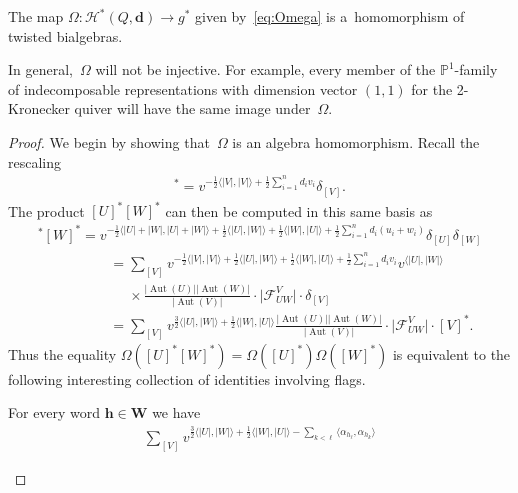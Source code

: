 \begin{Theorem}
\label{th:shuffle_character}
The map $\Omega: \mathcal{H}^*(Q,\mathbf{d})\to g^*$ given by~\eqref{eq:Omega} is a~homomorphism of twisted bialgebras.
\end{Theorem}

\begin{Remark}
In general,~$\Omega$ will not be injective.
For example, every member of the $\mathbb{P}^1$-family of indecomposable representations with dimension vector $(1,1)$
for the 2-Kronecker quiver will have the same image under~$\Omega$.
\end{Remark}

\begin{proof}
We begin by showing that~$\Omega$ is an algebra homomorphism.
Recall the rescaling
\begin{gather*}
[V]^*=v^{-\frac{1}{2}\langle |V|,|V|\rangle+\frac{1}{2}\sum\limits_{i=1}^n d_iv_i}\delta_{[V]}.
\end{gather*}
The product $[U]^*[W]^*$ can then be computed in this same basis as
\begin{gather*}
[U]^*[W]^*=v^{-\frac{1}{2}\langle |U|+|W|,|U|+|W|\rangle+\frac{1}{2}\langle |U|,|W|\rangle+\frac{1}{2}\langle
|W|,|U|\rangle+\frac{1}{2}\sum\limits_{i=1}^n d_i(u_i+w_i)}\delta_{[U]}\delta_{[W]}
\\
\phantom{[U]^*[W]^*}
 =\sum\limits_{[V]}v^{-\frac{1}{2}\langle |V|,|V|\rangle+\frac{1}{2}\langle |U|,|W|\rangle+\frac{1}{2}\langle
|W|,|U|\rangle+\frac{1}{2}\sum\limits_{i=1}^n d_iv_i}v^{\langle|U|,|W|\rangle}
\\
\phantom{[U]^*[W]^*=}{}
\times
\frac{|\operatorname{Aut}(U)||\operatorname{Aut}(W)|}{|\operatorname{Aut}(V)|}\cdot\big|\mathcal{F}^V_{UW}\big|\cdot \delta_{[V]}
\\
\phantom{[U]^*[W]^*}
 =\sum\limits_{[V]}v^{\frac{3}{2}\langle |U|,|W|\rangle+\frac{1}{2}\langle
|W|,|U|\rangle}\frac{|\operatorname{Aut}(U)||\operatorname{Aut}(W)|}{|\operatorname{Aut}(V)|}\cdot\big|\mathcal{F}^V_{UW}\big|\cdot [V]^*.
\end{gather*}
Thus the equality $\Omega([U]^*[W]^*)=\Omega([U]^*)\Omega([W]^*)$ is equivalent to the following interesting collection
of identities involving f\/lags.
\begin{Lemma}
\label{lem:flag_identity}
For every word $\mathbf{h}\in\mathbf{W}$ we have
\begin{gather}
\nonumber
\sum\limits_{[V]} v^{\frac{3}{2}\langle |U|,|W|\rangle+\frac{1}{2}\langle|W|,|U|\rangle-\sum\limits_{k<\ell}\langle\alpha_{h_\ell},\alpha_{h_k}\rangle}

\end{gather}
\end{Lemma}
\end{proof}
